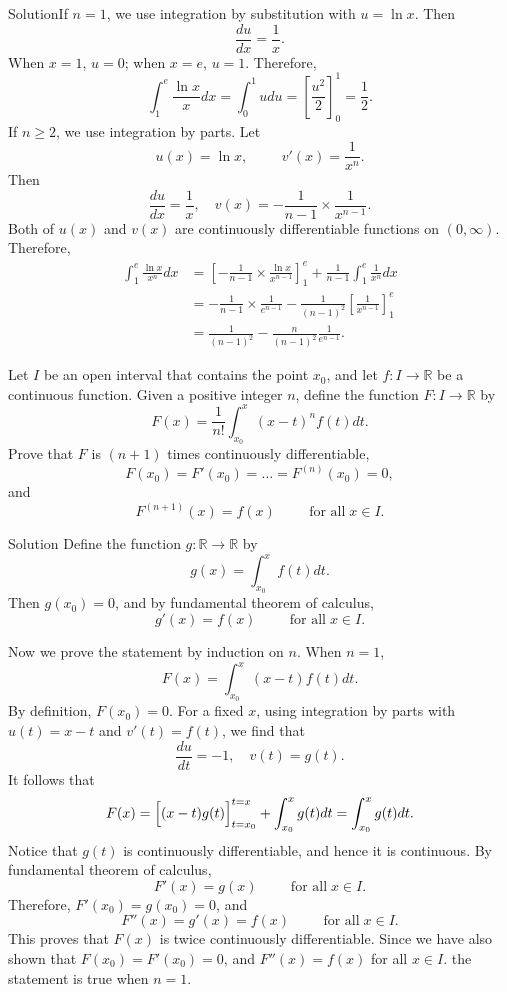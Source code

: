 \begin{example}[label=20230527]{}
\begin{example}{}
\end{example}
\begin{solution}{Solution}If $n=1$, we use integration by substitution with $u=\ln x$. Then
\[\frac{du}{dx}=\frac{1}{x}.\]
When $x=1$, $u=0$; when $x=e$, $u=1$. Therefore,
\[\int_1^e\frac{\ln x}{x}dx=\int_0^1udu=\left[\frac{u^2}{2}\right]_{0}^1=\frac{1}{2}.\]
If $n\geq 2$, we use integration by parts. Let 
\[u(x)=\ln x,\hspace{1cm}v'(x)=\frac{1}{x^{n}}.\]
Then
\[\frac{du}{dx}=\frac{1}{x},\quad v(x)=-\frac{1}{n-1}\times\frac{1}{x^{n-1}}.\]Both of $u(x)$ and $v(x)$ are continuously differentiable functions on $(0,\infty)$. 
\bs Therefore,
\begin{align*}\int_1^e\frac{\ln x}{x^n}dx&=\left[-\frac{1}{n-1}\times\frac{\ln x}{x^{n-1}}\right]_1^e+\frac{1}{n-1}\int_1^e\frac{1}{x^{n}}dx\\
&=-\frac{1}{n-1}\times\frac{1}{e^{n-1}}-\frac{1}{(n-1)^2}\left[\frac{1}{x^{n-1}}\right]_1^e\\
&=\frac{1}{(n-1)^2}-\frac{n}{(n-1)^2}\frac{1}{e^{n-1}}.
\end{align*}
\end{solution}
\begin{example}[label=230307_10]{}Let $I$ be an open interval that contains the point $x_0$, and 
let $f:I\to\mathbb{R}$ be a continuous function. Given  a positive integer $n$, define the function $F:I\to\mathbb{R}$ by
\[F(x)=\frac{1}{n!}\int_{x_0}^x(x-t)^nf(t)dt.\]
Prove that $F$ is $(n+1)$ times continuously differentiable, 
\[F(x_0)=F'(x_0)=\ldots=F^{(n)}(x_0)=0,\]
and
\[F^{(n+1)}(x)=f(x)\hspace{1cm}\text{for all}\;x\in I.\]
\end{example}
\begin{solution}
{Solution}
Define the function $g:\mathbb{R}\to\mathbb{R}$ by
\[g(x)=\int_{x_0}^xf(t)dt.\] Then $g(x_0)=0$, and 
by fundamental theorem of calculus,
\[g'(x)=f(x)\hspace{1cm}\text{for all}\;x\in I.\]

Now we prove the statement by induction on $n$. When $n=1$, 
\[F(x)=\int_{x_0}^x(x-t)f(t)dt.\]\bs
By definition, $F(x_0)=0$. 
For a fixed $x$, using integration by parts with $u(t)=x-t$ and $v'(t)=f(t)$, we find that  
\[\frac{du}{dt}=-1, \quad v(t)=g(t).\]  
It follows that
\[F(x)=\Bigl[(x-t)g(t)\Bigr]_{t=x_0}^{t=x}+\int_{x_0}^x g(t)dt=\int_{x_0}^x g(t)dt.\] Notice that $g(t)$ is continuously differentiable, and hence it is continuous. By fundamental theorem of calculus, 
\[F'(x)=g(x)\hspace{1cm}\text{for all}\;x\in I.\]
Therefore, $F'(x_0)=g(x_0)=0$, and 
\[F''(x)=g'(x)=f(x)\hspace{1cm}\text{for all}\;x\in I.\]
This proves that $F(x)$ is twice continuously differentiable. Since we have also shown that $F(x_0)=F'(x_0)=0$, and $F''(x)=f(x)$ for all $x\in I$.
 the statement is true when $n=1$.


\end{solution}
\end{example}
